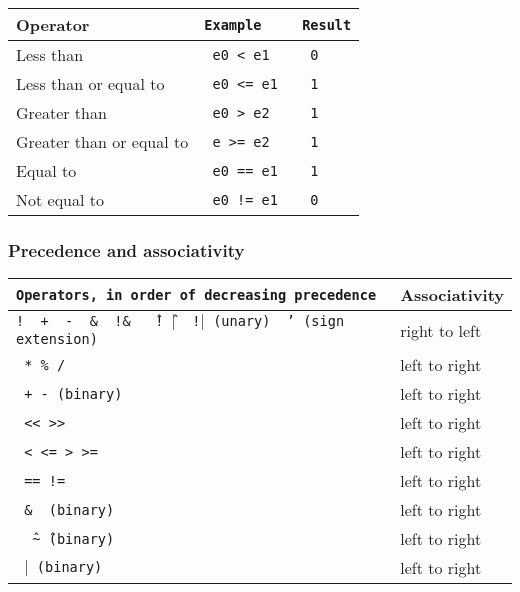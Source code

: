 \documentclass[letterpaper,11pt]{article}
\begin{document}
        
        \begin{center} 
        \begin{tabular}{|l|>{\texttt\bgroup}l<{\egroup}|>{\texttt\bgroup}l<{\egroup}|}
        \hline
        Operator&Example&Result\\ \hline
        Less than				&	e0 < e1 		&	0 \\ \hline
        Less than or equal to	&	e0 <= e1		& 	1 \\ \hline
        Greater than				&	e0 > e2		& 	1 \\ \hline
        Greater than or equal to &	e >= e2		& 	1 \\ \hline
        Equal to					& e0 == e1		& 	1 \\ \hline
        Not equal to				& e0 != e1		&	0 \\ \hline
        
        \end{tabular}
        \end{center}
        
        
        \subsubsection{Precedence and associativity}
        
        \begin{center} 
        \begin{tabular}{|>{\texttt\bgroup}l<{\egroup}|l|}
        \hline
        Operators, in order of decreasing precedence &Associativity\\ \hline
        ! \ + \ - \ \& \ !\&	 \ \^ \ !\^ 	\ $\mid$ \ !$\mid$ (unary) \ ' (sign extension) &	 right to left \\ \hline
        * \% /	& 	left to right \\ \hline
        	+ - (binary)		& 	left to right \\ \hline
        << >> & 	left to right \\ \hline
        < <= > >=					& 	left to right \\ \hline
        == !=				&	left to right \\ \hline
        \& \ (binary)				&	left to right \\ \hline
        \^ \ \textasciitilde\^ \ (binary)		&	left to right \\ \hline
        $\mid$ (binary)				&	left to right \\ \hline
        
        \end{tabular}
        \end{center}
        
\end{document}
